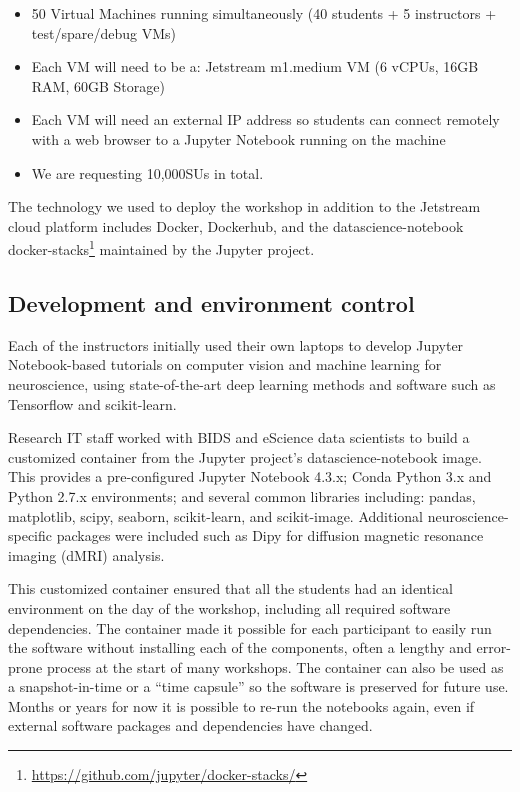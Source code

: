 \begin{itemize}
\item 50 Virtual Machines running simultaneously (40 students + 5 instructors +
test/spare/debug VMs)
\item Each VM will need to be a: Jetstream m1.medium VM (6 vCPUs, 16GB RAM, 60GB
  Storage)
\item Each VM will need an external IP address so students can connect remotely
  with a web browser to a Jupyter Notebook running on the machine
\item We are requesting 10,000SUs in total.
\end{itemize}


The technology we used to deploy the workshop in addition to the Jetstream cloud
platform includes Docker, Dockerhub, and the datascience-notebook docker-stacks\footnote{\url{https://github.com/jupyter/docker-stacks/}}
maintained by the Jupyter project.

\subsection{Development and environment control}

Each of the instructors initially used their own laptops to develop Jupyter
Notebook-based tutorials on computer vision and machine learning for
neuroscience, using state-of-the-art deep learning methods and software such as
Tensorflow and scikit-learn.

Research IT staff worked with BIDS and eScience data scientists to build a
customized container from the Jupyter project's datascience-notebook image. This
provides a pre-configured Jupyter Notebook 4.3.x; Conda Python 3.x and Python
2.7.x environments; and several common libraries including: pandas, matplotlib,
scipy, seaborn, scikit-learn, and scikit-image. Additional neuroscience-specific
packages were included such as Dipy for diffusion magnetic resonance imaging
(dMRI) analysis.

This customized container ensured that all the students had an identical
environment on the day of the workshop, including all required software
dependencies. The container made it possible for each participant to easily run
the software without installing each of the components, often a lengthy and
error-prone process at the start of many workshops. The container can also be
used as a snapshot-in-time or a ``time capsule'' so the software is preserved for
future use. Months or years for now it is possible to re-run the notebooks
again, even if external software packages and dependencies have changed.

